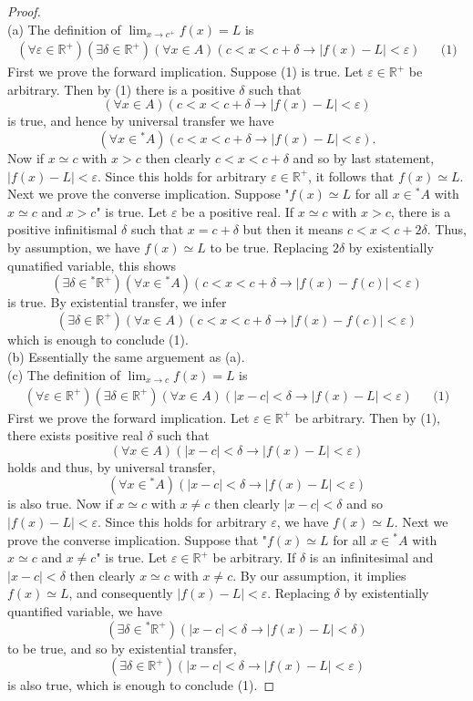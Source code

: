 \documentclass[a4paper, 11pt, openany]{book}
\theoremstyle{plain}
\theoremstyle{plain}
\newcommand{\arr}{\rightarrow}
\newcommand{\R}{\mathbb{R}}
\newcommand{\ep}{\varepsilon}
\newcommand{\del}{\delta}
\newcommand{\hyp}{{}^*}
\begin{document}
  \begin{proof} $ $ \\
    (a) The definition of $\lim_{x \arr c^+} f(x)=L$ is 
    \begin{align*}
        (\forall \ep \in \R^+)(\exists \del \in \R^+ )(\forall x \in A)(c<x<c+\delta \arr |f(x)-L|<\ep) & & \text{(1)}
    \end{align*}
    First we prove the forward implication. Suppose (1) is true. Let $\ep \in \R^+$ be arbitrary. Then by (1) there is a positive $\del$ such that $$(\forall x \in A)(c<x<c+\delta \arr |f(x)-L|<\ep)$$ is true, and hence by universal transfer we have $$(\forall x \in \hyp A)(c<x<c+\delta \arr |f(x)-L|<\ep).$$ Now if $x \simeq c$ with $x>c$ then clearly $c<x<c+\del$ and so by last statement, $|f(x)-L|<\ep$. Since this holds for arbitrary $\ep \in \R^+$, it follows that $f(x) \simeq L$. Next we prove the converse implication. Suppose "$f(x) \simeq L$ for all $x \in \hyp A$ with $x \simeq c$ and $x>c$" is true. Let $\ep$ be a positive real. If $x \simeq c$ with $x>c$, there is a positive infinitismal $\del$ such that $x=c+\del$ but then it means $c<x<c+2\del$. Thus, by assumption, we have $f(x) \simeq L$ to be true. Replacing $2\del$ by existentially qunatified variable, this shows $$(\exists \del \in \hyp \R^+)(\forall x \in \hyp A)(c<x<c+\del \arr |f(x)-f(c)|<\ep)$$ is true. By existential transfer, we infer $$(\exists \del \in \R^+)(\forall x \in A)(c<x<c+\del \arr |f(x)-f(c)|<\ep)$$ which is enough to conclude (1). \\

    (b) Essentially the same arguement as (a). \\

    (c) The definition of $\lim_{x \arr c} f(x)=L$ is \begin{align*}
      (\forall \ep \in \R^+)(\exists \del \in \R^+)(\forall x \in A)(|x-c|<\del \arr |f(x)-L|<\ep) & & \text{(1)}
    \end{align*}
    First we prove the forward implication. Let $\ep \in \R^+$ be arbitrary. Then by (1), there exists positive real $\del$ such that $$(\forall x \in A)(|x-c|<\del \arr |f(x)-L|<\ep)$$ holds and thus, by universal transfer, $$(\forall x \in \hyp A)(|x-c|<\del \arr |f(x)-L|<\ep)$$ is also true. Now if $x \simeq c$ with $x \neq c$ then clearly $|x-c|<\del$ and so $|f(x)-L|<\ep$. Since this holds for arbitrary $\ep$, we have $f(x) \simeq L$. Next we prove the converse implication. Suppose that "$f(x)\simeq L$ for all $x \in \hyp A$ with $x \simeq c$ and $x \neq c$" is true. Let $\ep \in \R^+$ be arbitrary. If $\del$ is an infinitesimal and $|x-c|<\del$ then clearly $x \simeq c$ with $x \neq c$. By our assumption, it implies $f(x) \simeq L$, and consequently $|f(x)-L|<\ep$. Replacing $\del$ by existentially quantified variable, we have $$(\exists \del \in \hyp \R^+)(|x-c|<\del \arr |f(x)-L|<\del)$$ to be true, and so by existential transfer, $$(\exists \del \in \R^+)(|x-c|<\del \arr |f(x)-L|<\ep)$$ is also true, which is enough to conclude (1).


\end{proof}
\end{document}
